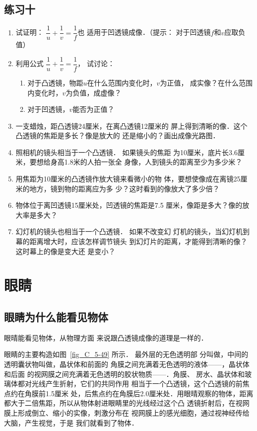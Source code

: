 \subsection*{练习十}

\begin{enumerate}
    \item 试证明：
$\dfrac{1}{u}+\dfrac{1}{v}=\dfrac{1}{f}$也
适用于凹透镜成像．（提示：
对于凹透镜$f$和$v$应取负值）
\item  利用公式
$\dfrac{1}{u}+\dfrac{1}{v}=\dfrac{1}{f}$，
试讨论：
\begin{enumerate}
    \item 对于凸透镜，物距$u$在什么范围内变化时，$v$为正值，
    成实像？在什么范围内变化时，$v$为负值，成虚像？
    \item 对于凹透镜，$v$能否为正值？
\end{enumerate}
\item 一支蜡烛，距凸透镜24厘米，在离凸透镜12厘米的
屏上得到清晰的像．这个凸透镜的焦距是多长？像是放大的
还是缩小的？画出成像光路图．
\item 照相机的镜头相当于一个凸透镜．
如果镜头的焦距
为10厘米，底片长3.6厘米，要想给身高1.8米的人拍一张全
身像，人到镜头的距离至少为多少米？
\item 用焦距为10厘米的凸透镜作放大镜来看微小的物
体，要想使像成在离镜25厘米的地方，镜到物的距离应为多
少？这时看到的像放大了多少倍？
\item 物体位于离凹透镜15厘米处，凹透镜的焦距是7.5
厘米，像距是多大？像的放大率是多大？
\item 幻灯机的镜头也相当于一个凸透镜．
如果不改变幻
灯机的镜头，当幻灯机到幕的距离增大时，应该怎样调节镜头
到幻灯片的距离，才能得到清晰的像？这时幕上的像是变大还
是变小？
\end{enumerate}

\section{眼睛}
\subsection{眼睛为什么能看见物体}

眼晴能看见物体，从物理方面
来说跟凸透镜成像的道理是一样的．


眼睛的主要构造如图~\ref{fig_C_5-49} 所示．
最外层的无色透明部
分叫做，中间的透明囊状物叫做，晶状体和前面的
角膜之间充满着无色透明的液体——，晶状体和后面
的视网膜之间充满着无色透明的胶状物质——．角膜、
房水、晶状体和玻璃体都对光线产生折射，它们的共同作用
相当于一个凸透镜，这个凸透镜的前焦点约在角膜前1.5厘米
处，后焦点约在角膜后2.0厘米处．用眼晴观察的物体，距离
都大于二倍焦距，所以从物体射进眼睛里的光线经过这个凸
透镜折射后，在视网膜上形成倒立、缩小的实像，刺激分布在
视网膜上的感光细胞，通过视神经传给大脑，产生视觉，于是
我们就看到了物体．

